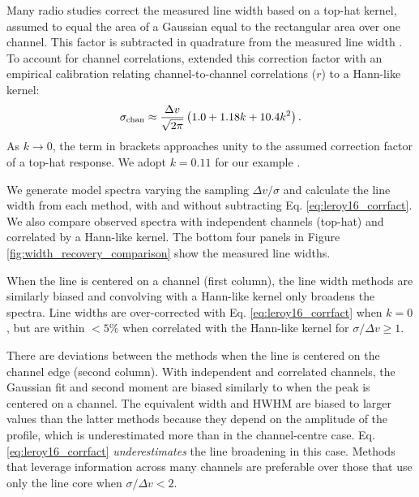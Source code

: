 \documentclass{rnaastex}
\begin{document}
Many radio studies correct the measured line width based on a top-hat kernel, assumed to equal the area of a Gaussian equal to the rectangular area over one channel. This factor is subtracted in quadrature from the measured line width \citep{cprops}.  To account for channel correlations, \citet{leroy2016} extended this correction factor with an empirical calibration relating channel-to-channel correlations ($r$) to a Hann-like kernel:
\begin{equation}
    \label{eq:leroy16_corrfact}
    \sigma_{\rm chan} \approx \frac{\Delta v}{\sqrt{2\pi}} \left( 1.0 + 1.18k + 10.4 k^2 \right).
\end{equation}
As $k\rightarrow0$, the term in brackets approaches unity to the assumed correction factor of a top-hat response.  We adopt $k=0.11$ for our example \citep[see][]{sun2018}.

We generate model spectra varying the sampling $\Delta v / \sigma$ and calculate the line width from each method, with and without subtracting Eq. \ref{eq:leroy16_corrfact}. We also compare observed spectra with independent channels (top-hat) and correlated by a Hann-like kernel. The bottom four panels in Figure \ref{fig:width_recovery_comparison} show the measured line widths.

When the line is centered on a channel (first column), the line width methods are similarly biased and convolving with a Hann-like kernel only broadens the spectra.  Line widths are over-corrected with Eq. \ref{eq:leroy16_corrfact} when $k=0$, but are within $<5\%$ when correlated with the Hann-like kernel for $\sigma/\Delta v \geq 1$.

There are deviations between the methods when the line is centered on the channel edge (second column). With independent and correlated channels, the Gaussian fit and second moment are biased similarly to when the peak is centered on a channel.  The equivalent width and HWHM are biased to larger values than the latter methods because they depend on the amplitude of the profile, which is underestimated more than in the channel-centre case. Eq. \ref{eq:leroy16_corrfact} {\it underestimates} the line broadening in this case. Methods that leverage information across many channels are preferable over those that use only the line core when $\sigma / \Delta v < 2$. 
\end{document}
